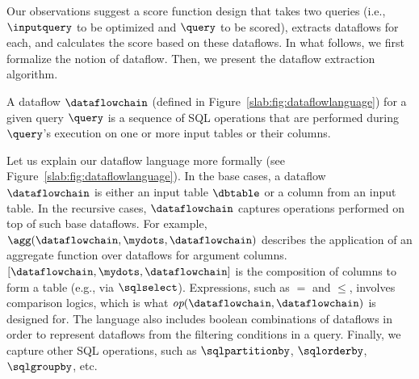 

Our observations suggest a score function design that takes two queries (i.e., $\inputquery$ to be optimized and $\query$ to be scored), extracts dataflows for each, and calculates the score based on these dataflows. 
In what follows, we first formalize the notion of dataflow.
Then, we present the dataflow extraction algorithm. 

\begin{definition}[Dataflow]
A dataflow $\dataflowchain$ (defined in Figure~\ref{slab:fig:dataflowlanguage}) for a given query $\query$ is a sequence of SQL operations that are performed during $\query$'s execution on one or more input tables or their columns.
\end{definition}


Let us explain our dataflow language more formally (see Figure~\ref{slab:fig:dataflowlanguage}).
In the base cases, a dataflow $\dataflowchain$ is either an input table $\dbtable$ or a column from an input table. 
In the recursive cases, $\dataflowchain$ captures operations performed on top of such base dataflows. 
For example, $\agg(\dataflowchain, \mydots, \dataflowchain)$ describes the application of an aggregate function over dataflows for argument columns. 
$[\dataflowchain, \mydots, \dataflowchain]$ is the composition of columns to form a table (e.g., via $\sqlselect$). 
Expressions, such as $=$ and $\leq$, involves comparison logics, which is what $\emph{op}(\dataflowchain, \dataflowchain)$ is designed for. The language also includes boolean combinations of dataflows in order to represent dataflows from the filtering conditions in a query.
Finally, we capture other SQL operations, such as $\sqlpartitionby$, $\sqlorderby$, $\sqlgroupby$, etc.

